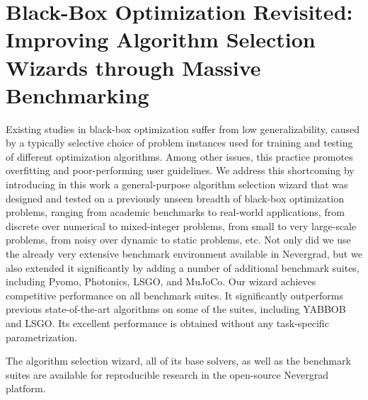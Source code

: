 \def\nevergradnewbranch{OptimSuite}
\def\ngoptq{ABBO}


\chapter{Black-Box Optimization Revisited: Improving Algorithm Selection Wizards through Massive Benchmarking}
\label{paper:benchmark}


Existing studies in black-box optimization suffer from low generalizability, caused by a typically selective choice of problem instances used for training and testing of different optimization algorithms. Among other issues, this practice promotes overfitting and poor-performing user guidelines. We address this shortcoming by introducing in this work a general-purpose algorithm selection wizard that was designed and tested on a previously unseen breadth of black-box optimization problems, ranging from academic benchmarks to real-world applications, from discrete over numerical to mixed-integer problems, from small to very large-scale problems, from noisy over dynamic to static problems, etc. Not only did we use the already very extensive benchmark environment available in Nevergrad, but we also extended it significantly by adding a number of additional benchmark suites, including Pyomo, Photonics, LSGO, and MuJoCo. Our wizard achieves competitive performance on all benchmark suites. It significantly outperforms previous state-of-the-art algorithms on some of the suites, including YABBOB and LSGO. Its excellent performance is obtained without any task-specific parametrization. 

The algorithm selection wizard, all of its base solvers, as well as the benchmark suites are available for reproducible research in the open-source Nevergrad platform.





